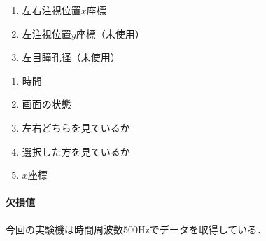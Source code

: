 \begin{center}
\begin{framed}
\begin{minipage}[t]{.48\textwidth}
\begin{enumerate}
\begin{itemize}
                      \end{itemize}
                \item 左右注視位置\(x\)座標
                \item 左注視位置\(y\)座標（未使用）
                \item 左目瞳孔径（未使用）
            \end{enumerate}
        \end{minipage}
        \begin{minipage}[t]{.26\textwidth}
            \begin{center}
                \expos
            \end{center}
            \begin{enumerate}
                \renewcommand{\labelenumi}{\theenumi 列目}
                \item 時間
                \item 画面の状態
                \item {\footnotesize 左右どちらを見ているか}
                \item {\footnotesize 選択した方を見ているか}
                \item \(x\)座標
            \end{enumerate}
        \end{minipage}
    \end{framed}
\end{center}
\paragraph{欠損値}
今回の実験機\elt は時間周波数\(500\textrm{Hz}\)でデータを取得している．

